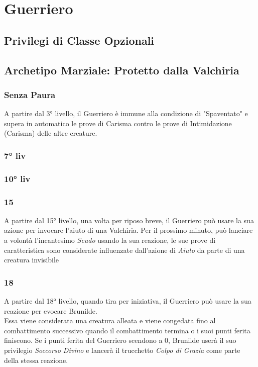 \chapter{Guerriero}

\section{Privilegi di Classe Opzionali}

\section{Archetipo Marziale: Protetto dalla Valchiria}

\subsection{Senza Paura}
A partire dal 3° livello, il Guerriero è immune alla condizione di "Spaventato" e supera in automatico le prove di Carisma contro le prove di Intimidazione (Carisma) delle altre creature.

\subsection{7° liv}

\subsection{10° liv}

\subsection{15}
A partire dal 15° livello, una volta per riposo breve, il Guerriero può usare la sua azione per invocare l'aiuto di una Valchiria.
Per il prossimo minuto, può lanciare a volontà l'incantesimo \textit{Scudo} usando la sua reazione, le sue prove di caratteristica sono considerate influenzate dall'azione di \textit{Aiuto} da parte di una creatura invisibile

\subsection{18}
A partire dal 18° livello, quando tira per iniziativa, il Guerriero può usare la sua reazione per evocare Brunilde. \\ Essa viene considerata una creatura alleata e viene congedata fino al combattimento successivo quando il combattimento termina o i suoi punti ferita finiscono. Se i punti ferita del Guerriero scendono a 0, Brunilde userà il suo privilegio \textit{Soccorso Divino} e lancerà il trucchetto \textit{Colpo di Grazia} come parte della stessa reazione.

